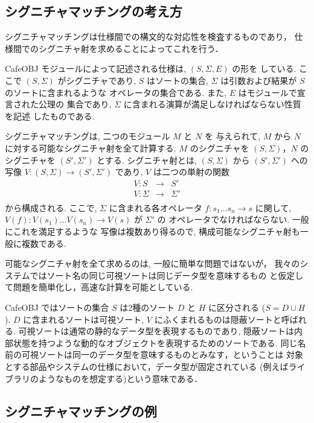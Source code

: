 \subsection{シグニチャマッチングの考え方}
シグニチャマッチングは仕様間での構文的な対応性を検査するものであり，
仕様間でのシグニチャ射を求めることによってこれを行う．

CafeOBJ モジュールによって記述される仕様は, $(S,\Sigma,E)$ の形を
している. ここで $(S, \Sigma)$ がシグニチャであり, $S$ はソートの集合,
$\Sigma$ は引数および結果が $S$ のソートに含まれるような
オペレータの集合である. また, $E$ はモジュールで宣言された公理の
集合であり, $\Sigma$ に含まれる演算が満足しなければならない性質を記述
したものである. 

シグニチャマッチングは, 二つのモジュール $M$ と $N$ を
与えられて, $M$ から $N$ に対する可能なシグニチャ射を全て計算する.
$M$ のシグニチャを $(S,\Sigma)$，$N$ のシグニチャを $(S',\Sigma')$ とする.
シグニチャ射とは, $(S,\Sigma)$ から $(S',\Sigma')$ への写像 
$V: (S,\Sigma) \rightarrow (S',\Sigma')$ であり,
$V$ は二つの単射の関数
$$
\begin{array}{lll}
 V: S &\rightarrow& S'\\
 V: \Sigma &\rightarrow&\Sigma'\\
\end{array}
$$
から構成される. ここで, $\Sigma$ に含まれる各オペレータ
$f: s_1\ldots s_n \rightarrow s$ に関して,
$V(f): V(s_1)\ldots V(s_n)\rightarrow V(s)$ が $\Sigma'$ の
オペレータでなければならない. 一般にこれを満足するような
写像は複数あり得るので, 構成可能なシグニチャ射も一般に複数である.

可能なシグニチャ射を全て求めるのは, 一般に簡単な問題ではないが，
我々のシステムではソート名の同じ可視ソートは同じデータ型を意味するもの
と仮定して問題を簡単化し，高速な計算を可能としている. 

CafeOBJ ではソートの集合 $S$ は2種のソート $D$ と $H$ に区分される
($S = D \cup H$). 
$D$ に含まれるソートは可視ソート, $V$ にふくまれるものは隠蔽ソートと呼ばれる.
可視ソートは通常の静的なデータ型を表現するものであり, 
隠蔽ソートは内部状態を持つような動的なオブジェクトを表現するためのソートである. 
同じ名前の可視ソートは同一のデータ型を意味するものとみなす，ということは
対象とする部品やシステムの仕様において，データ型が固定されている
(例えばライブラリのようなものを想定する)という意味である．

\subsection{シグニチャマッチングの例}
\label{sec:sigmatch-example}

